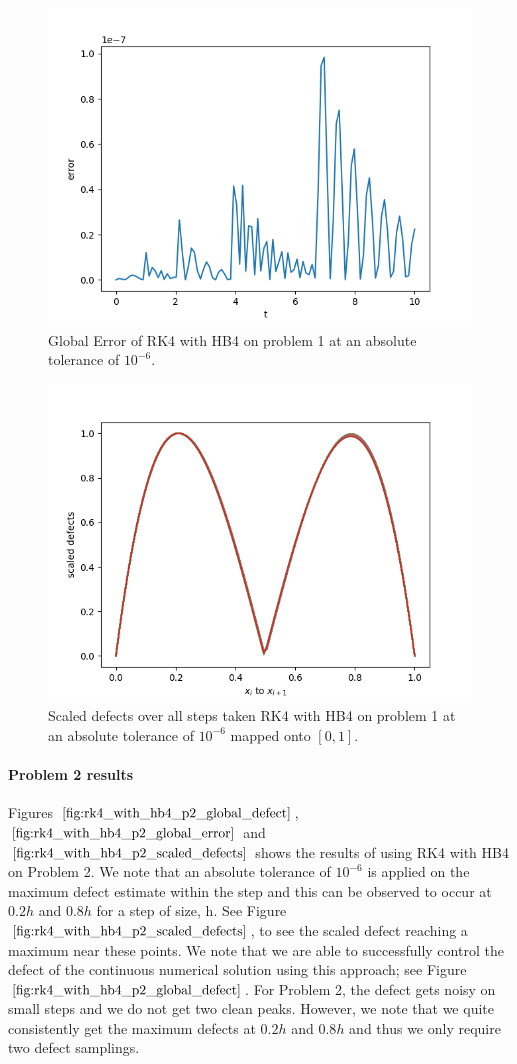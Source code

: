 \documentclass{article}
\begin{document}
\begin{figure}[H]
\centering
\includegraphics[width=0.7\linewidth]{./figures/rk4_with_hb4_p1_global_error}
\caption{Global Error of RK4 with HB4 on problem 1 at an absolute tolerance of $10^{-6}$.}
\label{fig:rk4_with_hb4_p1_global_error}
\end{figure}

\begin{figure}[H]
\centering
\includegraphics[width=0.7\linewidth]{./figures/rk4_with_hb4_p1_scaled_defects}
\caption{Scaled defects over all steps taken RK4 with HB4 on problem 1 at an absolute tolerance of $10^{-6}$ mapped onto $[0, 1]$.}
\label{fig:rk4_with_hb4_p1_scaled_defects}
\end{figure}

\paragraph{Problem 2 results}
Figures $\ref{fig:rk4_with_hb4_p2_global_defect}$, $\ref{fig:rk4_with_hb4_p2_global_error}$ and $\ref{fig:rk4_with_hb4_p2_scaled_defects}$ shows the results of using RK4 with HB4 on Problem 2. We note that an absolute tolerance of $10^{-6}$ is applied on the maximum defect estimate within the step and this can be observed to occur at $0.2h$ and $0.8h$ for a step of size, h. See Figure $\ref{fig:rk4_with_hb4_p2_scaled_defects}$, to see the scaled defect reaching a maximum near these points. We note that we are able to successfully control the defect of the continuous numerical solution using this approach; see Figure $\ref{fig:rk4_with_hb4_p2_global_defect}$. For Problem 2, the defect gets noisy on small steps and we do not get two clean peaks. However, we note that we quite consistently get the maximum defects at $0.2h$ and $0.8h$ and thus we only require two defect samplings.
\end{document}
